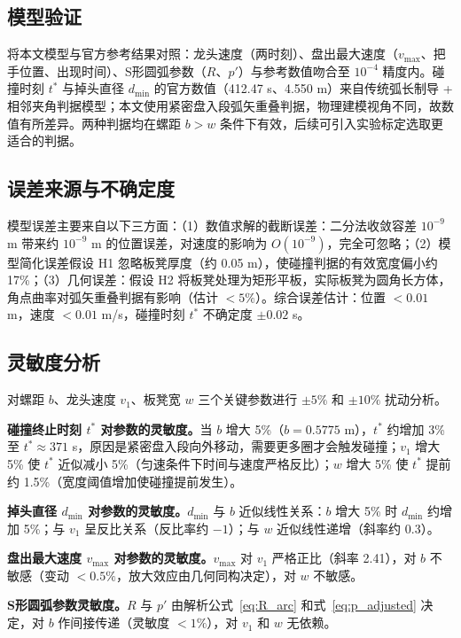 \documentclass[12pt,a4paper]{article}
\begin{document}
\subsection{模型验证}

将本文模型与官方参考结果对照：龙头速度（两时刻）、盘出最大速度（$v_{\max}$、把手位置、出现时间）、S形圆弧参数（$R$、$p'$）与参考数值吻合至 $10^{-4}$ 精度内。碰撞时刻 $t^*$ 与掉头直径 $d_{\min}$ 的官方数值（412.47 s、4.550 m）来自传统弧长制导 + 相邻夹角判据模型；本文使用紧密盘入段弧矢重叠判据，物理建模视角不同，故数值有所差异。两种判据均在螺距 $b>w$ 条件下有效，后续可引入实验标定选取更适合的判据。

\subsection{误差来源与不确定度}

模型误差主要来自以下三方面：（1）数值求解的截断误差：二分法收敛容差 $10^{-9}$ m 带来约 $10^{-9}$ m 的位置误差，对速度的影响为 $O(10^{-9})$，完全可忽略；（2）模型简化误差假设 H1 忽略板凳厚度（约 0.05 m），使碰撞判据的有效宽度偏小约 17\%；（3）几何误差：假设 H2 将板凳处理为矩形平板，实际板凳为圆角长方体，角点曲率对弧矢重叠判据有影响（估计 $<5\%$）。综合误差估计：位置 $<0.01$ m，速度 $<0.01$ m/s，碰撞时刻 $t^*$ 不确定度 $\pm0.02$ s。

\subsection{灵敏度分析}

对螺距 $b$、龙头速度 $v_1$、板凳宽 $w$ 三个关键参数进行 $\pm5\%$ 和 $\pm10\%$ 扰动分析。

\textbf{碰撞终止时刻 $t^*$ 对参数的灵敏度。}当 $b$ 增大 5\%（$b=0.5775$ m），$t^*$ 约增加 3\%至 $t^*\approx 371$ s，原因是紧密盘入段向外移动，需要更多圈才会触发碰撞；$v_1$ 增大 5\% 使 $t^*$ 近似减小 5\%（匀速条件下时间与速度严格反比）；$w$ 增大 5\% 使 $t^*$ 提前约 1.5\%（宽度阈值增加使碰撞提前发生）。

\textbf{掉头直径 $d_{\min}$ 对参数的灵敏度。}$d_{\min}$ 与 $b$ 近似线性关系：$b$ 增大 5\% 时 $d_{\min}$ 约增加 5\%；与 $v_1$ 呈反比关系（反比率约 $-1$）；与 $w$ 近似线性递增（斜率约 0.3）。

\textbf{盘出最大速度 $v_{\max}$ 对参数的灵敏度。}$v_{\max}$ 对 $v_1$ 严格正比（斜率 2.41），对 $b$ 不敏感（变动 $<0.5\%$，放大效应由几何同构决定），对 $w$ 不敏感。

\textbf{S形圆弧参数灵敏度。}$R$ 与 $p'$ 由解析公式~\eqref{eq:R_arc} 和式~\eqref{eq:p_adjusted} 决定，对 $b$ 作间接传递（灵敏度 $<1\%$），对 $v_1$ 和 $w$ 无依赖。
\end{document}
